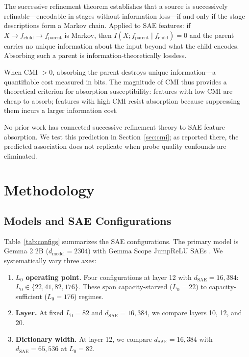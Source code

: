 \documentclass{article}
\begin{document}
The successive refinement theorem \citep{equitz1991successive} establishes that a source is successively refinable---encodable in stages without information loss---if and only if the stage descriptions form a Markov chain. Applied to SAE features: if $X \to f_{\text{child}} \to f_{\text{parent}}$ is Markov, then $I(X; f_{\text{parent}} \mid f_{\text{child}}) = 0$ and the parent carries no unique information about the input beyond what the child encodes. Absorbing such a parent is information-theoretically lossless.

When CMI $> 0$, absorbing the parent destroys unique information---a quantifiable cost measured in bits. The magnitude of CMI thus provides a theoretical criterion for absorption susceptibility: features with low CMI are cheap to absorb; features with high CMI resist absorption because suppressing them incurs a larger information cost.

No prior work has connected successive refinement theory to SAE feature absorption. We test this prediction in Section~\ref{sec:cmi}; as reported there, the predicted association does not replicate when probe quality confounds are eliminated.


\section{Methodology}
\label{sec:method}

\subsection{Models and SAE Configurations}

Table~\ref{tab:configs} summarizes the SAE configurations. The primary model is Gemma 2 2B ($d_{\text{model}} = 2304$) with Gemma Scope JumpReLU SAEs \citep{lieberum2024gemmascope}. We systematically vary three axes:

\begin{enumerate}
\item \textbf{$L_0$ operating point.} Four configurations at layer 12 with $d_{\text{SAE}} = 16{,}384$: $L_0 \in \{22, 41, 82, 176\}$. These span capacity-starved ($L_0 = 22$) to capacity-sufficient ($L_0 = 176$) regimes.
\item \textbf{Layer.} At fixed $L_0 = 82$ and $d_{\text{SAE}} = 16{,}384$, we compare layers 10, 12, and 20.
\item \textbf{Dictionary width.} At layer 12, we compare $d_{\text{SAE}} = 16{,}384$ with $d_{\text{SAE}} = 65{,}536$ at $L_0 = 82$.
\end{enumerate}
\end{document}
